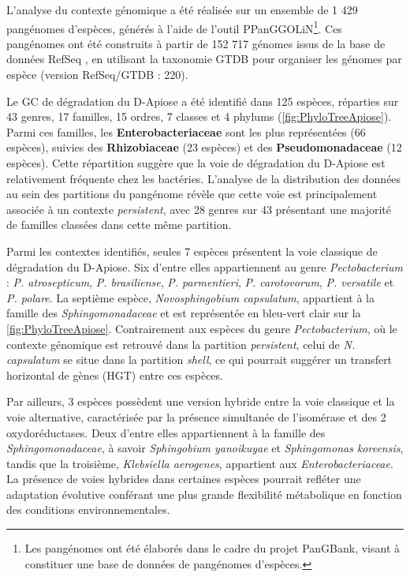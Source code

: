 L’analyse du contexte génomique a été réalisée sur un ensemble de 1 429 pangénomes d’espèces, générés à l’aide de l’outil PPanGGOLiN\footnote{Les pangénomes ont été élaborés dans le cadre du projet PanGBank, visant à constituer une base de données de pangénomes d’espèces.}. Ces pangénomes ont été construits à partir de 152 717 génomes issus de la base de données RefSeq \cite{pruitt_ncbi_2007}, en utilisant la taxonomie GTDB \cite{parks_standardized_2018} pour organiser les génomes par espèce (version RefSeq/GTDB : 220).

\newpage

Le GC de dégradation du D-Apiose a été identifié dans 125 espèces, réparties sur 43 genres, 17 familles, 15 ordres, 7 classes et 4 phylums (\autoref{fig:PhyloTreeApiose}). Parmi ces familles, les \textbf{Enterobacteriaceae} sont les plus représentées (66 espèces), suivies des \textbf{Rhizobiaceae} (23 espèces) et des \textbf{Pseudomonadaceae} (12 espèces). Cette répartition suggère que la voie de dégradation du D-Apiose est relativement fréquente chez les bactéries.
L’analyse de la distribution des données au sein des partitions du pangénome révèle que cette voie est principalement associée à un contexte \textit{persistent}, avec 28 genres sur 43 présentant une majorité de familles classées dans cette même partition.

Parmi les contextes identifiés, seules 7 espèces présentent la voie classique de dégradation du D-Apiose. Six d’entre elles appartiennent au genre \textit{Pectobacterium} : \textit{P. atrosepticum}, \textit{P. brasiliense}, \textit{P. parmentieri}, \textit{P. carotovorum}, \textit{P. versatile} et \textit{P. polare}. La septième espèce, \textit{Novosphingobium capsulatum}, appartient à la famille des \textit{Sphingomonadaceae} et est représentée en bleu-vert clair sur la \autoref{fig:PhyloTreeApiose}. Contrairement aux espèces du genre \textit{Pectobacterium}, où le contexte génomique est retrouvé dans la partition \textit{persistent}, celui de \textit{N. capsulatum} se situe dans la partition \textit{shell}, ce qui pourrait suggérer un transfert horizontal de gènes (HGT) entre ces espèces.

Par ailleurs, 3 espèces possèdent une version hybride entre la voie classique et la voie alternative, caractérisée par la présence simultanée de l’isomérase et des 2 oxydoréductases. Deux d’entre elles appartiennent à la famille des \textit{Sphingomonadaceae}, à savoir \textit{Sphingobium yanoikuyae} et \textit{Sphingomonas koreensis}, tandis que la troisième, \textit{Klebsiella aerogenes}, appartient aux \textit{Enterobacteriaceae}. La présence de voies hybrides dans certaines espèces pourrait refléter une adaptation évolutive conférant une plus grande flexibilité métabolique en fonction des conditions environnementales.

